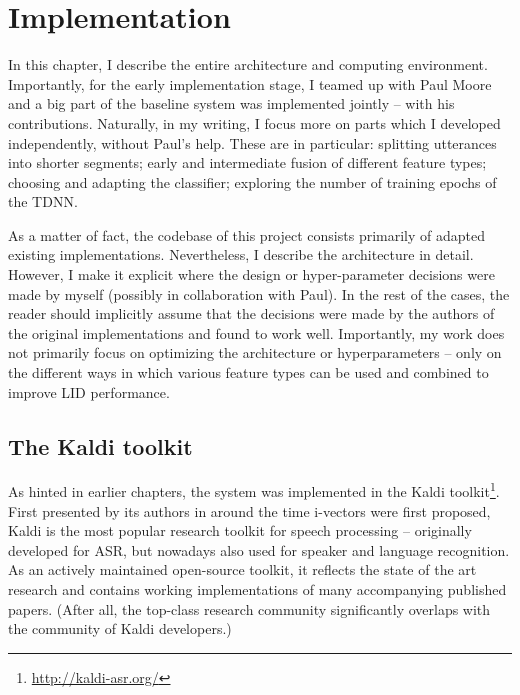 \documentclass[bsc,frontabs,twoside,singlespacing,parskip,deptreport]{infthesis}
\begin{document}
\chapter{Implementation}{
  \label{chap:Implementation}
  
  In this chapter, I describe the entire architecture and computing environment.
  Importantly, for the early implementation stage, I teamed up with Paul Moore and a big part of the baseline system was implemented jointly -- with his contributions. Naturally, in my writing, I focus more on parts which I developed independently, without Paul's help. These are in particular: splitting utterances into shorter segments; early and intermediate fusion of different feature types; choosing and adapting the classifier; exploring the number of training epochs of the TDNN.
  
  As a matter of fact, the codebase of this project consists primarily of adapted existing implementations. Nevertheless, I describe the architecture in detail. However, I make it explicit where the design or hyper-parameter decisions were made by myself (possibly in collaboration with Paul). In the rest of the cases, the reader should implicitly assume that the decisions were made by the authors of the original implementations and found to work well. Importantly, my work does not primarily focus on optimizing the architecture or hyperparameters -- only on the different ways in which various feature types can be used and combined to improve LID performance.

  \section{The Kaldi toolkit}{
    \label{sec:kaldi}

    As hinted in earlier chapters, the system was implemented in the Kaldi toolkit\footnote{\url{http://kaldi-asr.org/}}.
    First presented by its authors in \citep{Povey_et_al_2011} around the time i-vectors were first proposed, Kaldi is the most popular research toolkit for speech processing -- originally developed for ASR, but nowadays also used for speaker and language recognition.
    As an actively maintained open-source toolkit, it reflects the state of the art research and contains working implementations of many accompanying published papers. (After all, the top-class research community significantly overlaps with the community of Kaldi developers.)
    
}}
\end{document}
